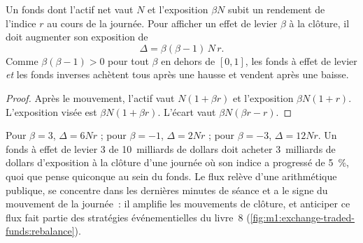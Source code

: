 \begin{proposition}\label{prop:m1:exchange-traded-funds:rebalance}
Un fonds dont l'actif net vaut $N$ et l'exposition $\beta N$ subit un rendement de l'indice
$r$ au cours de la journée. Pour afficher un effet de levier $\beta$ à la clôture, il doit
augmenter son exposition de
\[
\Delta = \beta(\beta - 1)\,N\,r .
\]
Comme $\beta(\beta-1) > 0$ pour tout $\beta$ en dehors de $[0,1]$, les fonds à effet de levier
\emph{et} les fonds inverses achètent tous après une hausse et vendent après une baisse.
\end{proposition}
\begin{proof}
Après le mouvement, l'actif vaut $N(1+\beta r)$ et l'exposition $\beta N(1+r)$.
L'exposition visée est $\beta N(1+\beta r)$. L'écart vaut $\beta N(\beta
r - r)$.
\end{proof}

\begin{example}\label{ex:m1:exchange-traded-funds:six}
Pour $\beta = 3$, $\Delta = 6Nr$ ; pour $\beta = -1$, $\Delta = 2Nr$ ; pour $\beta
= -3$, $\Delta = 12Nr$. Un fonds à effet de levier 3 de 10~milliards de dollars doit acheter
3~milliards de dollars d'exposition à la clôture d'une journée où son indice a progressé de 5~\%, quoi que pense quiconque
au sein du fonds. Le flux relève d'une arithmétique publique, se concentre dans les
dernières minutes de séance et a le signe du mouvement de la journée~: il amplifie les
mouvements de clôture, et anticiper ce flux fait partie des stratégies événementielles du livre~8
(\cref{fig:m1:exchange-traded-funds:rebalance}).
\end{example}

\begin{omfigure}

\label{fig:m1:exchange-traded-funds:rebalance}
\end{omfigure}

